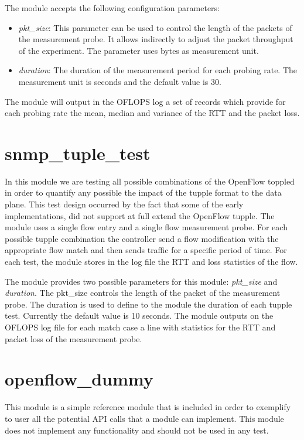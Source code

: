 \documentclass{book}
\begin{document}
  The module accepts the following configuration parameters:
  \begin{itemize}
  \item \emph{pkt\_size}: This parameter can be used to control the length of the
  packets of the measurement probe. It allows indirectly to adjust the packet
  throughput of the experiment. The parameter uses bytes as measurement unit.
  \item \emph{duration}: The duration of the measurement period for each probing
  rate. The measurement unit is seconds and the default value is 30. 
  \end{itemize}

  The module will output in the OFLOPS log a set of records which provide for each
  probing rate the mean, median and variance of the RTT and the packet loss. 

  \section{snmp\_tuple\_test}

  In this module we are testing all possible combinations of the OpenFlow toppled in
  order to quantify any possible the impact of the tupple format to the data plane. This test
  design occurred by the fact that some of the early implementations, did not
  support at full extend the OpenFlow tupple. The module uses a single flow entry
  and a single flow measurement probe. For each possible tupple combination the
  controller send a flow modification with the appropriate flow match and then
  sends traffic for a specific period of time. For each test, the module stores in the
  log file the RTT and loss statistics of the flow. 

  The module provides two possible parameters for this module: \emph{pkt\_size}
  and \emph{duration}. The pkt\_size controls the length of the packet of the
  measurement probe. The duration is used to define to the module the duration of
  each tupple test. Currently the default value is 10 seconds. The module
  outputs on the OFLOPS log file for each match case a line with statistics for
  the RTT and packet loss of the measurement probe.  
  
  \section{openflow\_dummy}

  This module is a simple reference module that is included in order to exemplify
  to user all the potential API calls that a module can implement. This module
  does not implement any functionality and should not be used in any test.
\end{document}
